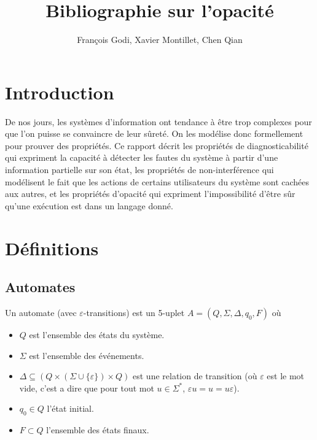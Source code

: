 \documentclass[10pt,a4paper]{article}
\begin{document}
    \title{Bibliographie sur l'opacit\'e}

    \author{François Godi, Xavier Montillet, Chen Qian}

\maketitle


\section*{Introduction}

De nos jours, les syst\`emes d'information ont tendance \`a \^etre trop complexes pour que l'on puisse se convaincre de leur sûret\'e. On les mod\'elise donc formellement pour prouver des propriétés.  Ce rapport d\'ecrit les propri\'et\'es de diagnosticabilit\'e qui expriment la capacit\'e \`a d\'etecter les fautes du syst\`eme \`a partir d'une information partielle sur son \'etat, les propri\'et\'es de non-interf\'erence qui mod\'elisent le fait que les actions de certains utilisateurs du syst\`eme sont cach\'ees aux autres, et les propri\'et\'es d'opacit\'e qui expriment l'impossibilit\'e d'\^etre s\^ur qu'une ex\'ecution est dans un langage donn\'e.

\section{Définitions}

\subsection{Automates}

Un automate (avec $\varepsilon$-transitions) est un 5-uplet $A = (Q, \Sigma, \Delta, q_0, F)$ o\`u
\begin{itemize}
	\item $Q$ est l'ensemble des états du système.
	\item $\Sigma$ est l'ensemble des événements.
	\item $\Delta \subseteq (Q \times (\Sigma \cup \{\varepsilon\}) \times Q)$ est une relation de transition (o\`u $\varepsilon$ est le mot vide, c'est a dire que pour tout mot $u\in\Sigma^*$, $\varepsilon u = u = u\varepsilon$).
	\item $q_0 \in Q$ l'état initial.
	\item $F \subset Q$ l'ensemble des \'etats finaux.
\end{itemize}
\end{document}
